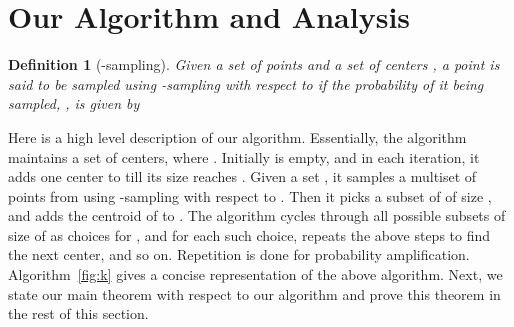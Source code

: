 \documentclass[11pt]{article}
\newtheorem{definition}{Definition}
\begin{document}
\section{Our Algorithm and Analysis}
\label{sec:algo-analysis}

\begin{definition}[-sampling]
Given a set of points  and a set of centers , a point  is said to be sampled using {\em -sampling}
with respect to  if the probability of it being sampled, ,  is given by

\end{definition}

Here is a high level description of our algorithm. 
Essentially, the algorithm maintains a set  of centers, where . 
Initially  is empty, and in each iteration, it adds one center to  till its size reaches . 
Given a set , it samples a multiset  of  points from  using -sampling with respect to . 
Then it picks  a subset  of  of size , and adds the centroid of  to . 
The algorithm cycles through all possible  subsets of size  of  as choices for , and for each such choice,
repeats the above steps to find the next center, and so on. 
Repetition is done for probability amplification.
Algorithm~\ref{fig:k} gives a concise representation of the above algorithm.
Next, we state our main theorem with respect to our algorithm and prove this theorem in the rest of this section.
\end{document}
